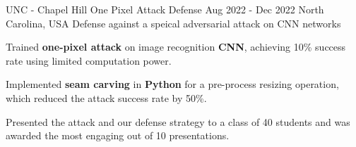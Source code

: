 

\begin{cventries}

  \cventry
    {UNC - Chapel Hill} %
    {One Pixel Attack Defense} %
    {Aug 2022 - Dec 2022} %
    {North Carolina, USA} %
    {Defense against a speical adversarial attack on CNN networks}
    {
      \begin{cvitems} %
        \item {Trained \textbf{one-pixel attack} on image recognition \textbf{CNN}, achieving 10\% success rate using limited computation power.}
        \item {Implemented \textbf{seam carving} in \textbf{Python} for a pre-process resizing operation, which reduced the attack success rate by 50\%.}
        \item {Presented the attack and our defense strategy to a class of 40 students and was awarded the most engaging out of 10 presentations.}
      \end{cvitems}
    }


\end{cventries}
